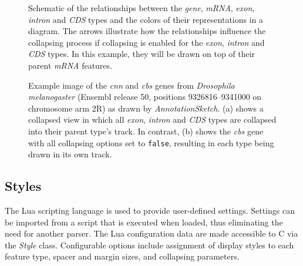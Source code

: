 \documentclass[a4paper]{scrreprt}
\begin{document}
\begin{figure}
\caption{Schematic of the relationships between the \emph{gene}, \emph{mRNA}, \emph{exon}, \emph{intron} and \emph{CDS} types and the colors of their representations in a diagram. The arrows illustrate how the relationships influence the collapsing process if collapsing is enabled for the \emph{exon}, \emph{intron} and \emph{CDS} types. In this example, they will be drawn on top of their parent \emph{mRNA} features.}
\label{collapsetypes}
\end{figure}
\begin{figure}
\caption{Example image of the \emph{cnn} and \emph{cbs} genes from \emph{Drosophila melanogaster} (Ensembl release 50, positions 9326816--9341000 on chromosome arm 2R) as drawn by \emph{AnnotationSketch}. (a) shows a collapsed view in which all \emph{exon}, \emph{intron} and \emph{CDS} types are collapsed into their parent type's track. In contrast, (b) shows the \emph{cbs} gene with all collapsing options set to \texttt{false}, resulting in each type being drawn in its own track.}
\label{cnn_large}
\end{figure}


\subsection{Styles}
The Lua scripting language is used to provide
user-defined settings. Settings can be imported from a script that is executed
when loaded, thus eliminating the need for another parser. The Lua configuration
data are made accessible to C via the \emph{Style} class. Configurable options
include assignment of display styles to each feature type, spacer and margin
sizes, and collapsing parameters.
\end{document}
